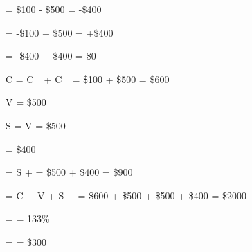 


 = \$100 - \$500 = -\$400

 = -\$100 + \$500 = +\$400

 = -\$400 + \$400 = \$0


C = C_{} + C_{} = \$100 + \$500 = \$600

V = \$500

S = V = \$500

\pi = \$400

 = S + \pi = \$500 + \$400 = \$900

 = C + V + S + \pi = \$600 + \$500 + \$500 + \$400 = \$2000


 =  = 133\%


 =  = \$300

